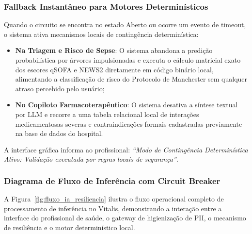\subsubsection{Fallback Instantâneo para Motores Determinísticos}
Quando o circuito se encontra no estado Aberto ou ocorre um evento de timeout, o sistema ativa mecanismos locais de contingência determinística:
\begin{itemize}
    \item \textbf{Na Triagem e Risco de Sepse}: O sistema abandona a predição probabilística por árvores impulsionadas e executa o cálculo matricial exato dos escores qSOFA e NEWS2 diretamente em código binário local, alimentando a classificação de risco do Protocolo de Manchester sem qualquer atraso percebido pelo usuário;
    \item \textbf{No Copiloto Farmacoterapêutico}: O sistema desativa a síntese textual por LLM e recorre a uma tabela relacional local de interações medicamentosas severas e contraindicações formais cadastradas previamente na base de dados do hospital.
\end{itemize}

A interface gráfica informa ao profissional: \textit{``Modo de Contingência Determinística Ativo: Validação executada por regras locais de segurança''}.

\subsubsection{Diagrama de Fluxo de Inferência com Circuit Breaker}
A Figura~\ref{fig:fluxo_ia_resiliencia} ilustra o fluxo operacional completo de processamento de inferência no Vitalis, demonstrando a interação entre a interface do profissional de saúde, o gateway de higienização de PII, o mecanismo de resiliência e o motor determinístico local.

